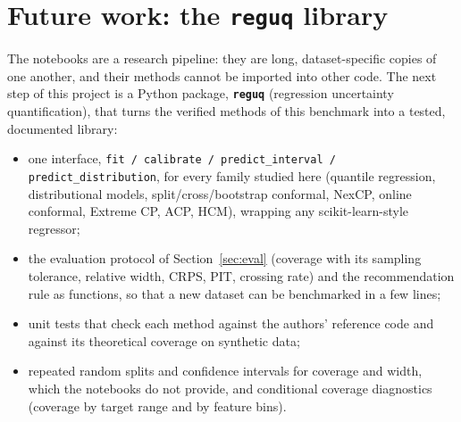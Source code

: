 \documentclass[11pt]{article}
\begin{document}
\section{Future work: the \texttt{reguq} library}\label{sec:future}
The notebooks are a research pipeline: they are long, dataset-specific copies of one another, and their methods cannot be imported
into other code. The next step of this project is a Python package, \textbf{\texttt{reguq}} (regression uncertainty quantification),
that turns the verified methods of this benchmark into a tested, documented library:
\begin{itemize}
\item one interface, \texttt{fit / calibrate / predict\_interval / predict\_distribution}, for every family studied here (quantile
regression, distributional models, split/cross/bootstrap conformal, NexCP, online conformal, Extreme CP, ACP, HCM), wrapping any
scikit-learn-style regressor;
\item the evaluation protocol of Section~\ref{sec:eval} (coverage with its sampling tolerance, relative width, CRPS, PIT, crossing
rate) and the recommendation rule as functions, so that a new dataset can be benchmarked in a few lines;
\item unit tests that check each method against the authors' reference code and against its theoretical coverage on synthetic data;
\item repeated random splits and confidence intervals for coverage and width, which the notebooks do not provide, and conditional
coverage diagnostics (coverage by target range and by feature bins).
\end{itemize}
\end{document}
